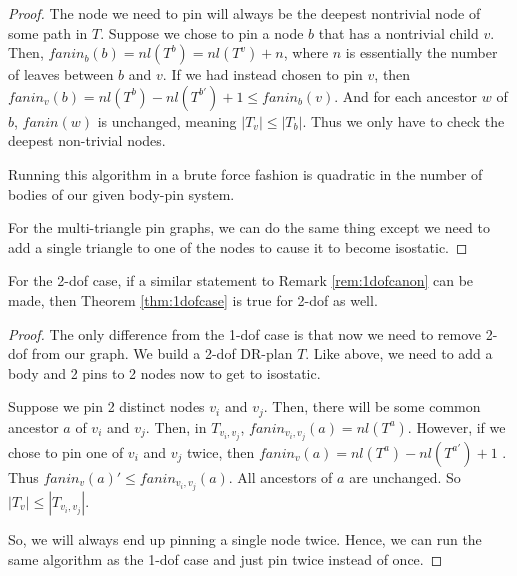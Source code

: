\begin{proof}

    The node we need to pin will always be the deepest nontrivial node of some path in $T$. Suppose we chose to pin a node $b$ that has a nontrivial child $v$. Then, $fanin_b(b) = nl(T^b) = nl(T^v) + n$, where $n$ is essentially the number of leaves between $b$ and $v$. If we had instead chosen to pin $v$, then $fanin_v(b) = nl(T^b) - nl(T^{b'}) + 1 \leq fanin_b(v)$. And for each ancestor $w$ of $b$, $fanin(w)$ is unchanged, meaning $|T_v| \leq |T_b|$. Thus we only have to check the deepest non-trivial nodes.

    Running this algorithm in a brute force fashion is quadratic in the number of bodies of our given body-pin system.

    For the multi-triangle pin graphs, we can do the same thing except we need to add a single triangle to one of the nodes to cause it to become isostatic.

\end{proof}

\begin{observation}
    For the 2-dof case, if a similar statement to Remark \ref{rem:1dofcanon} can be made, then Theorem \ref{thm:1dofcase} is true for 2-dof as well.
\end{observation}

\begin{proof}
    The only difference from the 1-dof case is that now we need to remove 2-dof from our graph. We build a 2-dof DR-plan $T$. Like above, we need to add a body and 2 pins to 2 nodes now to get to isostatic.

    Suppose we pin 2 distinct nodes $v_i$ and $v_j$. Then, there will be some common ancestor $a$ of $v_i$ and $v_j$. Then, in $T_{v_i,v_j}$, $fanin_{v_i,v_j}(a) = nl(T^a)$. However, if we chose to pin one of $v_i$ and $v_j$ twice, then $fanin_v(a) = nl(T^a) - nl(T^{a'}) +1$ . Thus $fanin_v(a)' \leq fanin_{v_i,v_j}(a)$. All ancestors of $a$ are unchanged. So $|T_v| \leq |T_{v_i,v_j}|$.

    So, we will always end up pinning a single node twice. Hence, we can run the same algorithm as the 1-dof case and just pin twice instead of once.
\end{proof}

